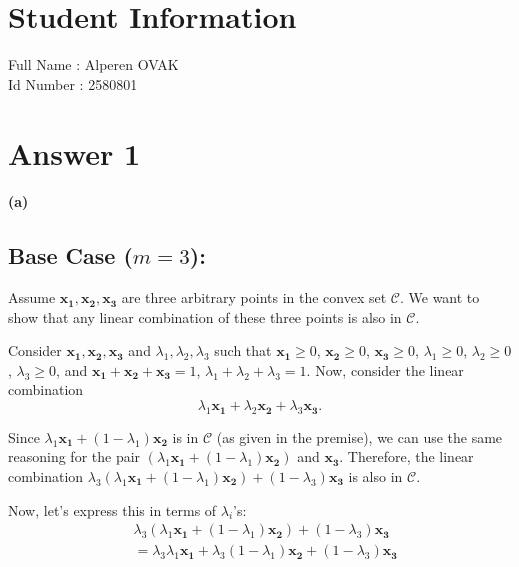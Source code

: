 \documentclass[12pt]{article}
\begin{document}
\section*{Student Information } 
Full Name :  Alperen OVAK\\
Id Number :  2580801\\

\section*{Answer 1}

\paragraph{(a)}

\subsection*{Base Case ($m = 3$):}

Assume $\mathbf{x_1, x_2, x_3}$ are three arbitrary points in the convex set $\mathcal{C}$. We want to show that any linear combination of these three points is also in $\mathcal{C}$.

Consider $\mathbf{x_1, x_2, x_3}$ and $\lambda_1, \lambda_2, \lambda_3$ such that $\mathbf{x_1} \geq 0$, $\mathbf{x_2} \geq 0$, $\mathbf{x_3} \geq 0$, $\lambda_1 \geq 0$, $\lambda_2 \geq 0$, $\lambda_3 \geq 0$, and $\mathbf{x_1} + \mathbf{x_2} + \mathbf{x_3} = 1$, $\lambda_1 + \lambda_2 + \lambda_3 = 1$. Now, consider the linear combination
\[
\lambda_1 \mathbf{x_1} + \lambda_2 \mathbf{x_2} + \lambda_3 \mathbf{x_3}.
\]

Since $\lambda_1 \mathbf{x_1} + (1 - \lambda_1) \mathbf{x_2}$ is in $\mathcal{C}$ (as given in the premise), we can use the same reasoning for the pair $(\lambda_1 \mathbf{x_1} + (1 - \lambda_1) \mathbf{x_2})$ and $\mathbf{x_3}$. Therefore, the linear combination $\lambda_3(\lambda_1 \mathbf{x_1} + (1 - \lambda_1) \mathbf{x_2}) + (1 - \lambda_3) \mathbf{x_3}$ is also in $\mathcal{C}$.

Now, let's express this in terms of $\lambda_i$'s:
\[
\begin{aligned}
&\lambda_3(\lambda_1 \mathbf{x_1} + (1 - \lambda_1) \mathbf{x_2}) + (1 - \lambda_3) \mathbf{x_3} \\
&= \lambda_3 \lambda_1 \mathbf{x_1} + \lambda_3 (1 - \lambda_1) \mathbf{x_2} + (1 - \lambda_3) \mathbf{x_3} \\
\end{aligned}
\]
\end{document}
